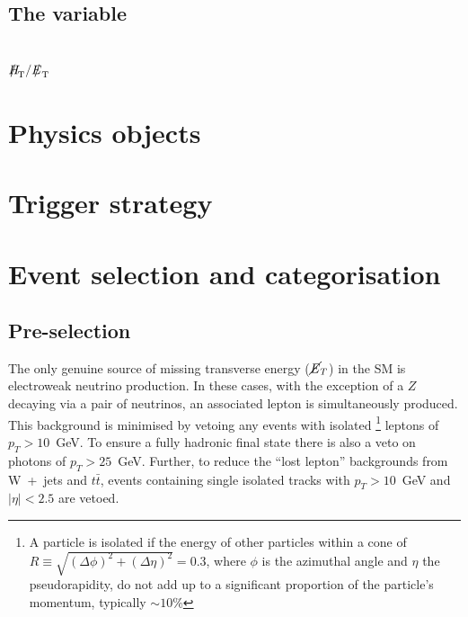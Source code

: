 \subsection{The \bdphi variable}




\subsection{$\MHT/\MET$}



\section{Physics objects} %






\section{Trigger strategy}





\section{Event selection and categorisation} %

\subsection{Pre-selection}
\label{sec:preselection}

The only genuine source of missing transverse energy ($\cancel{E}_T$)
in the SM is electroweak neutrino production. In these cases, with the
exception of a $Z$ decaying via a pair of neutrinos, an associated
lepton is simultaneously produced. This background is minimised by
vetoing any events with isolated \footnote{A particle is isolated if
the energy of other particles within a cone of
$R\equiv\sqrt{(\Delta\phi)^2+(\Delta\eta)^2}=0.3$, where $\phi$ is the
azimuthal angle and $\eta$ the pseudorapidity, do not add up to a
significant proportion of the particle's momentum, typically
$\sim10$\%} leptons of $p_T>10$~GeV. To ensure a fully hadronic final
state there is also a veto on photons of $p_T>25$~GeV. Further, to
reduce the ``lost lepton'' backgrounds from W~+~jets and $t\bar{t}$,
events containing single isolated tracks with $p_T >10$~GeV and
$|\eta| < 2.5$ are vetoed.

